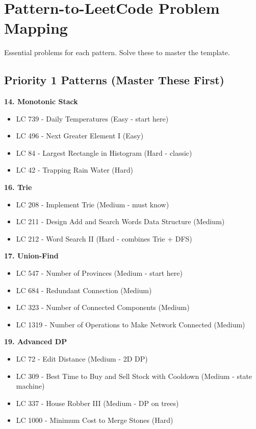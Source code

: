 \documentclass[10pt]{article}
\begin{document}
\newpage

\section{Pattern-to-LeetCode Problem Mapping}

Essential problems for each pattern. Solve these to master the template.

\subsection{Priority 1 Patterns (Master These First)}

\textbf{14. Monotonic Stack}
\begin{itemize}
\item LC 739 - Daily Temperatures (Easy - start here)
\item LC 496 - Next Greater Element I (Easy)
\item LC 84 - Largest Rectangle in Histogram (Hard - classic)
\item LC 42 - Trapping Rain Water (Hard)
\end{itemize}

\textbf{16. Trie}
\begin{itemize}
\item LC 208 - Implement Trie (Medium - must know)
\item LC 211 - Design Add and Search Words Data Structure (Medium)
\item LC 212 - Word Search II (Hard - combines Trie + DFS)
\end{itemize}

\textbf{17. Union-Find}
\begin{itemize}
\item LC 547 - Number of Provinces (Medium - start here)
\item LC 684 - Redundant Connection (Medium)
\item LC 323 - Number of Connected Components (Medium)
\item LC 1319 - Number of Operations to Make Network Connected (Medium)
\end{itemize}

\textbf{19. Advanced DP}
\begin{itemize}
\item LC 72 - Edit Distance (Medium - 2D DP)
\item LC 309 - Best Time to Buy and Sell Stock with Cooldown (Medium - state machine)
\item LC 337 - House Robber III (Medium - DP on trees)
\item LC 1000 - Minimum Cost to Merge Stones (Hard)
\end{itemize}
\end{document}
